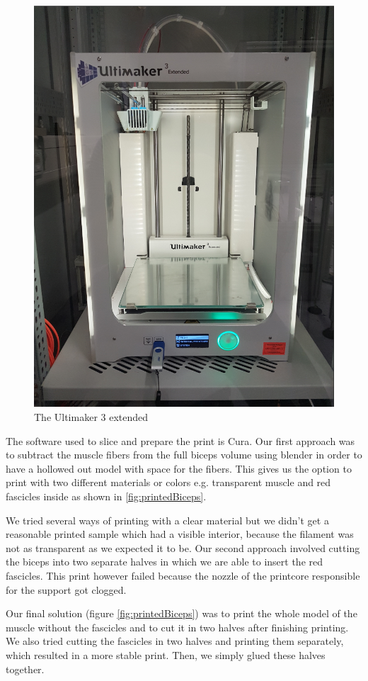 \documentclass[preprint,journal]{vgtc}       %
\begin{document}
\begin{figure}
	\centering
	\includegraphics[width=.75\linewidth]{ultimaker-pinter2.png}
	\caption{The Ultimaker 3 extended}
	\label{fig:3dPrinter}
\end{figure}

The software used to slice and prepare the print is Cura. 
Our first approach was to subtract the muscle fibers from the full biceps volume using blender in order to have a hollowed out model with space for the fibers. 
This gives us the option to print with two different materials or colors e.g. transparent muscle and red fascicles inside as shown in \ref{fig:printedBiceps}. 

We tried several ways of printing with a clear material but we didn't get a reasonable printed sample which had a visible interior, because the filament was not as transparent as we expected it to be.
Our second approach involved cutting the biceps into two separate halves in which we are able to insert the red fascicles. 
This print however failed because the nozzle of the printcore responsible for the support got clogged. 

Our final solution (figure \ref{fig:printedBiceps}) was to print the whole model of the muscle without the fascicles and to cut it in two halves after finishing printing.  
We also tried cutting the fascicles in two halves and printing them separately, which resulted in a more stable print. 
Then, we simply glued these halves together.
\end{document}

